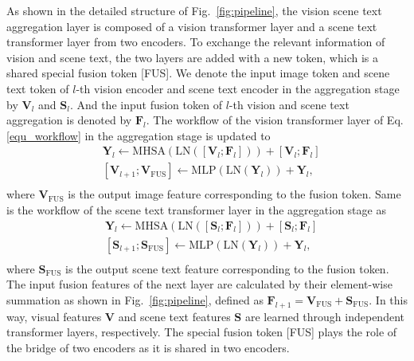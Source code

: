 \documentclass[10pt,twocolumn,letterpaper]{article}
\begin{document}
As shown in the detailed structure of Fig.~\ref{fig:pipeline}, the vision scene text aggregation layer is composed of a vision transformer layer and a scene text transformer layer from two encoders. 
To exchange the relevant information of vision and scene text, the two layers are added with a new token, which is a shared special fusion token [FUS]. We denote the input image token and scene text token of $l$-th vision encoder and scene text encoder in the aggregation stage by $\mathbf{V}_l$ and $\mathbf{S}_l$. And the input fusion token of $l$-th vision and scene text aggregation is denoted by $\mathbf{F}_l$.
The workflow of the vision transformer layer of Eq. \ref{equ_workflow} in the aggregation stage is updated to
\begin{equation}
\begin{aligned}
    &\mathbf{Y}_l \gets \mathrm{MHSA}(\mathrm{LN}([\mathbf{V}_l; \mathbf{F}_l])) + \left[  \mathbf{V}_l; \mathbf{F}_l \right]\\
    &\left[  \mathbf{V}_{l+1}; \mathbf{V}_{\mathrm{FUS}} \right] \gets  \mathrm{MLP}( \mathrm{LN}(\mathbf{Y}_l)) + \mathbf{Y}_l, \\
\end{aligned}
\end{equation}
where $\mathbf{V}_{\mathrm{FUS}}$ is the output image feature corresponding to the fusion token.
Same is the workflow of the scene text transformer layer in the aggregation stage as
\begin{equation}
\begin{aligned}
    &\mathbf{Y}_l \gets \mathrm{MHSA}( \mathrm{LN}( [  \mathbf{S}_l; \mathbf{F}_l ] )) + \left[  \mathbf{S}_l; \mathbf{F}_l \right]\\
    &\left[  \mathbf{S}_{l+1}; \mathbf{S}_{\mathrm{FUS}} \right] \gets  \mathrm{MLP}(\mathrm{LN}( \mathbf{Y}_l)) + \mathbf{Y}_l, \\
\end{aligned}
\end{equation}
where $\mathbf{S}_{\mathrm{FUS}}$ is the output scene text feature corresponding to the fusion token.
The input fusion features of the next layer are calculated by their element-wise summation as shown in Fig.~\ref{fig:pipeline}, defined as $\mathbf{F}_{l+1} = \mathbf{V}_{\mathrm{FUS}} + \mathbf{S}_{\mathrm{FUS}}$. In this way, visual features $\mathbf{V}$ and scene text features $\mathbf{S}$ are learned through independent transformer layers, respectively. 
The special fusion token [FUS] plays the role of the bridge of two encoders as it is shared in two encoders. 
\end{document}
